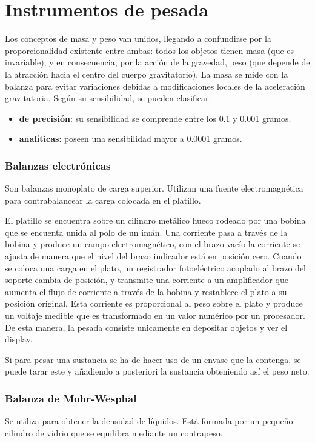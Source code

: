 \section{Instrumentos de pesada}
Los conceptos de masa y peso van unidos, llegando a confundirse por la proporcionalidad existente entre ambas: todos los objetos tienen masa (que es invariable), y en consecuencia, por la acción de la gravedad, peso (que depende de la atracción hacia el centro del cuerpo gravitatorio).  La masa se mide con la balanza para evitar variaciones debidas a modificaciones locales de la aceleración gravitatoria. Según su sensibilidad, se pueden clasificar:
\begin{itemize}[itemsep=0pt,parsep=0pt,topsep=0pt,partopsep=0pt]
    \item \textbf{de precisión}: su sensibilidad se comprende entre los 0.1 y 0.001 gramos.
    \item\textbf{analíticas}: poseen una sensibilidad mayor a 0.0001 gramos.
\end{itemize}
\subsubsection{Balanzas electrónicas}
Son balanzas monoplato de carga superior. Utilizan una fuente electromagnética para contrabalancear la carga colocada en el platillo.

El platillo se encuentra sobre un cilindro metálico hueco rodeado por una bobina que se encuenta unida al polo de un imán. Una corriente pasa a través de la bobina y produce un campo electromagnético, con el brazo vacío la corriente se ajusta de manera que el nivel del brazo indicador está en posición cero. Cuando se coloca una carga en el plato, un registrador fotoeléctrico acoplado al brazo del soporte cambia de posición, y transmite una corriente a un amplificador que aumenta el flujo de corriente a través de la bobina y restablece el plato a su posición original. Esta corriente es proporcional al peso sobre el plato y produce un voltaje medible que es transformado en un valor numérico por un procesador. De esta manera, la pesada consiste unicamente en depositar objetos y ver el display.

Si para pesar una sustancia se ha de hacer uso de un envase que la contenga, se puede tarar este y añadiendo a posteriori la sustancia obteniendo así el peso neto.
\subsubsection{Balanza de Mohr-Wesphal}
Se utiliza para obtener la densidad de líquidos. Está formada por un pequeño cilindro de vidrio que se equilibra mediante un contrapeso.

